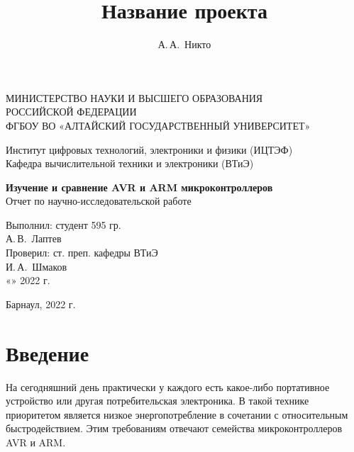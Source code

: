 \documentclass[12pt, oneside]{altsu-report}
\title{Название проекта}
\author{А.\,А.~Никто}
\institute{Институт цифровых технологий, электроники и физики}
\date{\the\year}
\begin{document}
\begin{titlepage}
 \begin{center}
    \normalsize
    МИНИСТЕРСТВО НАУКИ И ВЫСШЕГО ОБРАЗОВАНИЯ \\
    РОССИЙСКОЙ ФЕДЕРАЦИИ \\
    ФГБОУ ВО «АЛТАЙСКИЙ ГОСУДАРСТВЕННЫЙ УНИВЕРСИТЕТ»
    \vfill
     
    Институт цифровых технологий, электроники и физики (ИЦТЭФ) \\
    Кафедра вычислительной техники и электроники (ВТиЭ)
    \vfill
     
    \textbf{Изучение и сравнение AVR и ARM микроконтроллеров} \\
    Отчет по научно-исследовательской работе
 \end{center}
\vfill
 
\newlength{\ML}
\hfill\begin{minipage}{0.41\textwidth}
  Выполнил: студент 595 гр.\\
  \underline{\hspace{\ML}} А.\,В.~Лаптев \\
  Проверил: ст. преп. кафедры ВТиЭ\\
  \underline{\hspace{\ML}} И.\,А.~Шмаков \\
  «\underline{\hspace{1cm}}» \underline{\hspace{3cm}} 2022 г.
\end{minipage}%
\vfill
 
\begin{center}
  Барнаул, 2022 г.
\end{center}
\end{titlepage}

\setcounter{page}{2}
\makeabstract
\tableofcontents

\chapter*{Введение}

На сегодняшний день практически у каждого есть какое-либо портативное устройство или другая потребительская электроника. В такой технике приоритетом является низкое энергопотребление в сочетании с относительным быстродействием. Этим требованиям отвечают семейства микроконтроллеров AVR и ARM.
\end{document}
